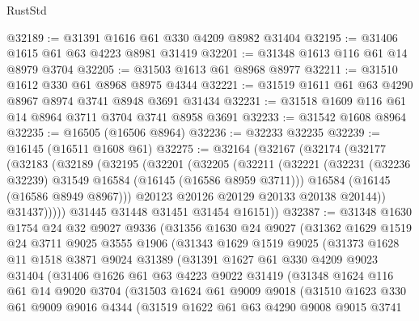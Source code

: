 \begin{lexlean}{RustStd}
\begin{coremodule}
@32189 := @31391 @1616 @61 @330 @4209 @8982 @31404
@32195 := @31406 @1615 @61 @63 @4223 @8981 @31419
@32201 := @31348 @1613 @116 @61 @14 @8979 @3704
@32205 := @31503 @1613 @61 @8968 @8977
@32211 := @31510 @1612 @330 @61 @8968 @8975 @4344
@32221 := @31519 @1611 @61 @63 @4290 @8967 @8974 @3741 @8948 @3691 @31434
@32231 := @31518 @1609 @116 @61 @14 @8964 @3711 @3704 @3741 @8958 @3691
@32233 := @31542 @1608 @8964
@32235 := @16505 (@16506 @8964)
@32236 := @32233 @32235
@32239 := @16145 (@16511 @1608 @61)
@32275 := @32164
    (@32167
      (@32174
        (@32177
          (@32183
            (@32189
              (@32195
                (@32201
                  (@32205
                    (@32211
                      (@32221
                        (@32231 (@32236 @32239) @31549 @16584 (@16145 (@16586 @8959 @3711)))
                        @16584
                        (@16145 (@16586 @8949 @8967)))
                      @20123
                      @20126
                      @20129
                      @20133
                      @20138
                      @20144))
                  @31437)))))
        @31445
        @31448
        @31451
        @31454
        @16151))
@32387 := @31348
    @1630
    @1754
    @24
    @32
    @9027
    @9336
    (@31356
      @1630
      @24
      @9027
      (@31362
        @1629
        @1519
        @24
        @3711
        @9025
        @3555
        @1906
        (@31343
          @1629
          @1519
          @9025
          (@31373
            @1628
            @11
            @1518
            @3871
            @9024
            @31389
            (@31391
              @1627
              @61
              @330
              @4209
              @9023
              @31404
              (@31406
                @1626
                @61
                @63
                @4223
                @9022
                @31419
                (@31348
                  @1624
                  @116
                  @61
                  @14
                  @9020
                  @3704
                  (@31503
                    @1624
                    @61
                    @9009
                    @9018
                    (@31510
                      @1623
                      @330
                      @61
                      @9009
                      @9016
                      @4344
                      (@31519
                        @1622
                        @61
                        @63
                        @4290
                        @9008
                        @9015
                        @3741

\end{coremodule}
\end{lexlean}
